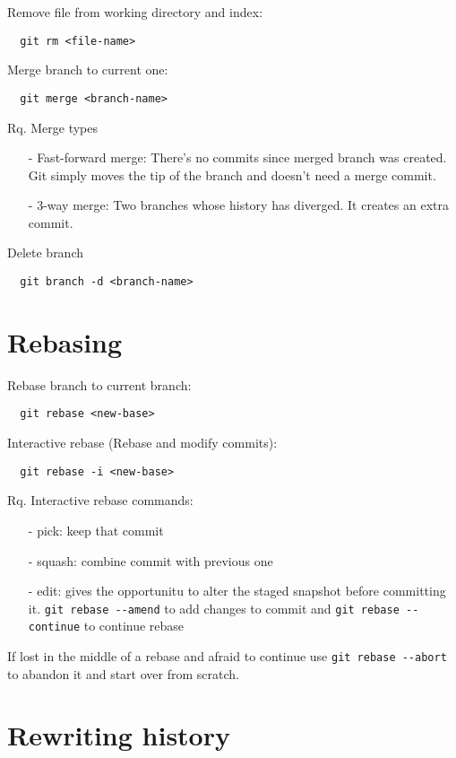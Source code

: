 \documentclass[french]{article}
\begin{document}
Remove file from working directory and index:
\begin{verbatim}
  git rm <file-name>
\end{verbatim}

Merge branch to current one:
\begin{verbatim}
  git merge <branch-name>
\end{verbatim}

Rq. Merge types
\begin{itemize}
  \item [-] Fast-forward merge: There's no commits since merged branch was created. Git simply moves the tip of the branch and doesn't need a merge commit.
  \item [-] 3-way merge: Two branches whose history has diverged. It creates an extra commit.
\end{itemize}$ $\\

Delete branch
\begin{verbatim}
  git branch -d <branch-name>
\end{verbatim}

\section{Rebasing}

Rebase branch to current branch:
\begin{verbatim}
  git rebase <new-base>
\end{verbatim}

Interactive rebase (Rebase and modify commits):
\begin{verbatim}
  git rebase -i <new-base>
\end{verbatim}

Rq. Interactive rebase commands:
\begin{itemize}
  \item [-] pick: keep that commit
  \item [-] squash: combine commit with previous one
  \item [-] edit: gives the opportunitu to alter the staged snapshot before committing it. \verb|git rebase --amend| to add changes to commit and \verb|git rebase --continue| to continue rebase
\end{itemize}
If lost in the middle of a rebase and afraid to continue use \verb|git rebase --abort| to abandon it and start over from scratch.
$ $\\

\section{Rewriting history}
\end{document}
